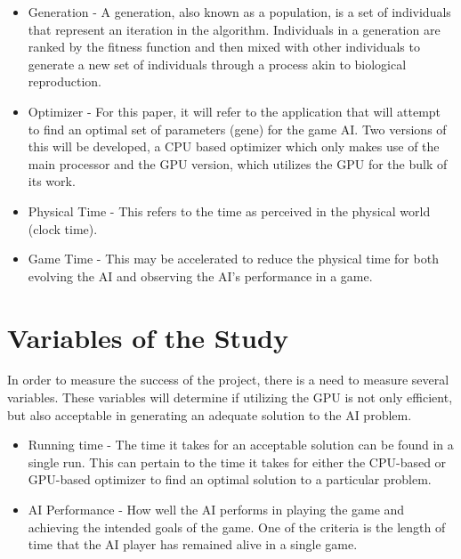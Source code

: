 \begin{itemize}
 \item Generation - A generation, also known as a population, is a set of individuals that represent
an iteration in the algorithm. Individuals in a generation are ranked by the fitness function and then
mixed with other individuals to generate a new set of individuals through a process akin to biological
reproduction.

  \item Optimizer - For this paper, it will refer to the application that will attempt to find an
optimal set of parameters (gene) for the game AI. Two versions of this will be developed, a CPU
based optimizer which only makes use of the main processor and the GPU version, which utilizes
the GPU for the bulk of its work.

  \item Physical Time - This refers to the time as perceived in the physical world
(clock time).

  \item Game Time - This may be accelerated to reduce the physical time for both
evolving the AI and observing the AI's performance in a game.

\end{itemize}

\section{Variables of the Study}

In order to measure the success of the project, there is a need to measure several variables. These
variables will determine if utilizing the GPU is not only efficient, but also acceptable in generating
an adequate solution to the AI problem.

\begin{itemize}
 \item Running time - The time it takes for an acceptable solution can be found in a single run.
This can pertain to the time it takes for either the CPU-based or GPU-based optimizer to find an
optimal solution to a particular problem.

 \item AI Performance - How well the AI performs in playing the game and achieving the intended goals
of the game. One of the criteria is the length of time that the AI player has remained alive in a single
game.
\end{itemize}